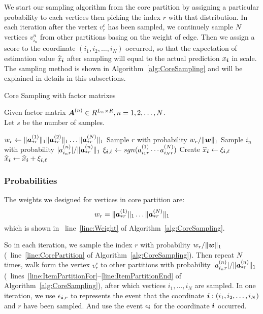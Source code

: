 \documentclass[letterpaper]{article}
\newcommand{\Sca}[3]{{#1}^{(#2)}_{i_#2#3}}%
\newcommand{\anr}[2]{\Sca{a}{#1}{#2}}
\newcommand{\score}[1]{\xi_{\V{i},#1}}
\newcommand{\V}[1]{{\bm{{\MakeLowercase{#1}}}}}
\newcommand{\VnC}[3]{\V{#1}^{(#2)}_{#3}}
\newcommand{\Nrocl}[2]{\norm{\VnC{a}{#1}{*#2}}{1}}
\newcommand{\Vacol}[1]{\V{a}^{(#1)}_{*r}}
\newcommand{\M}[1]{{\bm{{\MakeUppercase{#1}}}}}
\newcommand{\norm}[2]{\|#1\|_{#2}}
\newcommand{\Alg}[1] {Algorithm~\ref{alg:#1}}
\newcommand{\AlgLine}[2]{line~\ref{line:#2} of Algorithm~\ref{alg:#1}}
\newcommand{\AlgLines}[3]{lines~\ref{line:#2}--\ref{line:#3} of Algorithm~\ref{alg:#1}}
\newcommand{\coord}{(i_1,i_2,\ldots,i_N)}
\newcommand{\WeightR}{\Nrocl{1}{r}\ldots\Nrocl{N}{r}}
\newcommand{\predx}{\widehat{x}_{\V{i}}}
\begin{document}
We start our sampling algorithm from the core partition
by assigning a particular probability to each vertices
then picking the index $r$ with that distribution.
In each iteration after the vertex $v^c_r$ has been sampled,
we continuely sample $N$ vertices $v^{n}_{i_n}$ from other partitions
basing on the weight of edge.
Then we assign a score to the coordinate $\coord$ occurred,
so that the expectation of estimation value $\widehat{x}_\V{i}$
after sampling will equal to the actual prediction $x_\V{i}$ in scale.
The sampling method is shown in \Alg{CoreSampling} and will be explained in details
in this subsections.
\begin{algorithm}[t]
    \caption{Core Sampling with factor matrixes}
    \label{alg:CoreSampling}
    Given factor matrix $\M{A}^{(n)}\in R^{L_n\times R}, n = 1,2,\ldots,N$.\\
    Let $s$ be the number of samples.
    \begin{algorithmic}[1]
    \State $w_r \leftarrow \Nrocl{1}{r}\norm{\Vacol{2}}{1}\ldots\Nrocl{N}{r}$
    \label{line:Weight}
    \EndFor
    \State Sample $r$ with probability $w_r/\norm{\V{W}}{1}$
    \label{line:CorePartition}
    \label{line:ItemPartitionFor}
    \State Sample $i_n$ with probability $|\anr{n}{r}|/\norm{\Vacol{n}}{1}$
    \EndFor
    \label{line:ItemPartitionEnd}
    \State
    \label{line:Scoring}
        $\score{\ell} \leftarrow sgn(\anr{1}{r}\cdots\anr{N}{r})$
    \If {$\V{i}=\coord$ has not been sampled}
    \State  Create $\predx \leftarrow \score{\ell} $
    \Else
    \State $\predx \leftarrow \predx + \score{\ell}$
    \EndIf
    \EndFor
    \label{line:ScoringEnd}
    \end{algorithmic}
\end{algorithm}

\subsubsection{Probabilities}
The weights we designed for vertices in core partition are:
\[
    w_r = \WeightR
\]
which is shown in ~\AlgLine{CoreSampling}{Weight}.

So in each iteration, we sample the index $r$
with probability $w_r/\norm{\V{w}}{1}$
(~\AlgLine{CoreSampling}{CorePartition}).
Then repeat $N$ times,
walk form the vertex $v^c_r$ to other partitions with probability
$|\anr{n}{r}|/\norm{\Vacol{n}}{1}$
(~\AlgLines{CoreSampling}{ItemPartitionFor}{ItemPartitionEnd}),
after which vertices $i_1,\ldots,i_N$ are sampled.
In one iteration, we use $\epsilon_{\V{i},r}$ to represents the event that
the coordinate $\V{i}:\coord$ and $r$ have been sampled.
And use the event $\epsilon_{\V{i}}$ for the coordinate $\V{i}$ occurred.
\end{document}
